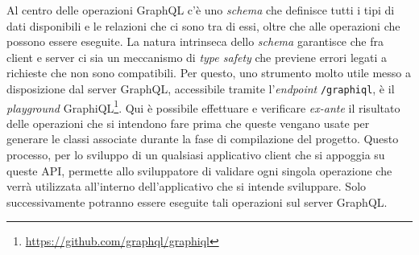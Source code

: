 Al centro delle operazioni GraphQL c'è uno \textit{schema} che definisce tutti i tipi di dati disponibili e le relazioni che ci sono tra di essi, oltre che alle operazioni che possono essere eseguite. La natura intrinseca dello \textit{schema} garantisce che fra client e server ci sia un meccanismo di \textit{type safety} che previene errori legati a richieste che non sono compatibili. Per questo, uno strumento molto utile messo a disposizione dal  server GraphQL, accessibile tramite l'\textit{endpoint} \texttt{/graphiql}, è il \textit{playground} GraphiQL\footnote{\url{https://github.com/graphql/graphiql}}. Qui è possibile effettuare e verificare \textit{ex-ante} il risultato delle operazioni che si intendono fare prima che queste vengano usate per generare le classi associate durante la fase di compilazione del progetto. Questo processo, per lo sviluppo di un qualsiasi applicativo client che si appoggia su queste \ac{API}, permette allo sviluppatore di validare ogni singola operazione che verrà utilizzata all'interno dell'applicativo che si intende sviluppare.  Solo successivamente potranno essere eseguite tali operazioni sul server GraphQL.
